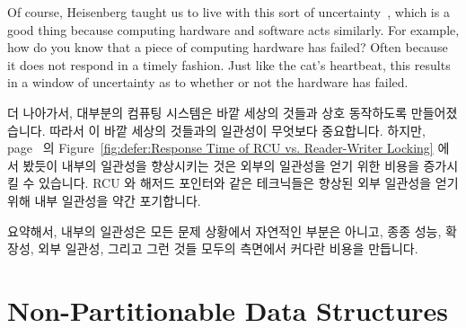 Of course, Heisenberg taught us to live with this sort of
uncertainty~\cite{WeinerHeisenberg1927Uncertain}, which is a good
thing because computing hardware and software acts similarly.
For example, how do you know that a piece of computing hardware
has failed?
Often because it does not respond in a timely fashion.
Just like the cat's heartbeat, this results in a window of
uncertainty as to whether or not the hardware has failed.
\fi

더 나아가서, 대부분의 컴퓨팅 시스템은 바깥 세상의 것들과 상호 동작하도록
만들어졌습니다.
따라서 이 바깥 세상의 것들과의 일관성이 무엇보다 중요합니다.
하지만,
page~\pageref{fig:defer:Response Time of RCU vs. Reader-Writer Locking} 의
Figure~\ref{fig:defer:Response Time of RCU vs. Reader-Writer Locking}
에서 봤듯이 내부의 일관성을 향상시키는 것은 외부의 일관성을 얻기 위한 비용을
증가시킬 수 있습니다.
RCU 와 해저드 포인터와 같은 테크닉들은 향상된 외부 일관성을 얻기 위해 내부
일관성을 약간 포기합니다.

요약해서, 내부의 일관성은 모든 문제 상황에서 자연적인 부분은 아니고, 종종 성능,
확장성, 외부 일관성, 그리고 그런 것들 모두의 측면에서 커다란 비용을 만듭니다.

\section{Non-Partitionable Data Structures}
\label{sec:datastruct:Non-Partitionable Data Structures}

